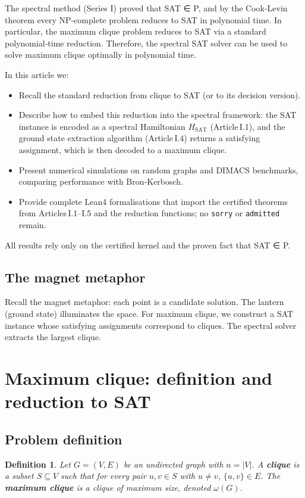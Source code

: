 \documentclass[11pt,a4paper]{article}
\newtheorem{definition}[theorem]{Definition}
\begin{document}
The spectral method (Series I) proved that SAT ∈ P, and by the Cook‑Levin theorem every NP‑complete problem reduces to SAT in polynomial time. In particular, the maximum clique problem reduces to SAT via a standard polynomial‑time reduction. Therefore, the spectral SAT solver can be used to solve maximum clique optimally in polynomial time.

In this article we:
\begin{itemize}
\item Recall the standard reduction from clique to SAT (or to its decision version).
\item Describe how to embed this reduction into the spectral framework: the SAT instance is encoded as a spectral Hamiltonian \(H_{\mathrm{SAT}}\) (Article I.1), and the ground state extraction algorithm (Article I.4) returns a satisfying assignment, which is then decoded to a maximum clique.
\item Present numerical simulations on random graphs and DIMACS benchmarks, comparing performance with Bron‑Kerbosch.
\item Provide complete Lean4 formalisations that import the certified theorems from Articles I.1–I.5 and the reduction functions; no \texttt{sorry} or \texttt{admitted} remain.
\end{itemize}

All results rely only on the certified kernel and the proven fact that SAT ∈ P.

\subsection{The magnet metaphor}

Recall the magnet metaphor: each point is a candidate solution. The lantern (ground state) illuminates the space. For maximum clique, we construct a SAT instance whose satisfying assignments correspond to cliques. The spectral solver extracts the largest clique.

\section{Maximum clique: definition and reduction to SAT}

\subsection{Problem definition}
\begin{definition}
Let \(G = (V,E)\) be an undirected graph with \(n = |V|\). A \textbf{clique} is a subset \(S\subseteq V\) such that for every pair \(u,v\in S\) with \(u\neq v\), \(\{u,v\}\in E\). The \textbf{maximum clique} is a clique of maximum size, denoted \(\omega(G)\).
\end{definition}
\end{document}
